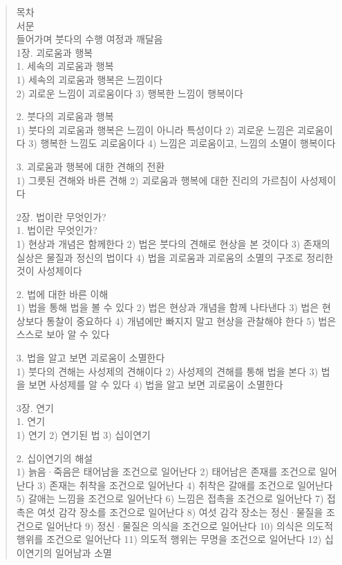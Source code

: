 \documentclass[12pt, a4paper, oneside]{book}
\begin{document}
\begin{quotation}

목차\\
서문\\
들어가며  붓다의 수행 여정과 깨달음\\

1장. 괴로움과 행복\\
1. 세속의 괴로움과 행복\\
1) 세속의 괴로움과 행복은 느낌이다\\
2) 괴로운 느낌이 괴로움이다
3) 행복한 느낌이 행복이다

2. 붓다의 괴로움과 행복\\
1) 붓다의 괴로움과 행복은 느낌이 아니라 특성이다
2) 괴로운 느낌은 괴로움이다
3) 행복한 느낌도 괴로움이다
4) 느낌은 괴로움이고, 느낌의 소멸이 행복이다

3. 괴로움과 행복에 대한 견해의 전환\\
1) 그릇된 견해와 바른 견해
2) 괴로움과 행복에 대한 진리의 가르침이 사성제이다

2장. 법이란 무엇인가?\\

1. 법이란 무엇인가?\\
1) 현상과 개념은 함께한다
2) 법은 붓다의 견해로 현상을 본 것이다
3) 존재의 실상은 물질과 정신의 법이다
4) 법을 괴로움과 괴로움의 소멸의 구조로 정리한 것이 사성제이다

2. 법에 대한 바른 이해\\
1) 법을 통해 법을 볼 수 있다
2) 법은 현상과 개념을 함께 나타낸다
3) 법은 현상보다 통찰이 중요하다
4) 개념에만 빠지지 말고 현상을 관찰해야 한다
5) 법은 스스로 보아 알 수 있다

3. 법을 알고 보면 괴로움이 소멸한다\\
1) 붓다의 견해는 사성제의 견해이다
2) 사성제의 견해를 통해 법을 본다
3) 법을 보면 사성제를 알 수 있다
4) 법을 알고 보면 괴로움이 소멸한다

3장. 연기\\

1. 연기\\
1) 연기
2) 연기된 법
3) 십이연기

2. 십이연기의 해설\\
1) 늙음·죽음은 태어남을 조건으로 일어난다
2) 태어남은 존재를 조건으로 일어난다
3) 존재는 취착을 조건으로 일어난다
4) 취착은 갈애를 조건으로 일어난다
5) 갈애는 느낌을 조건으로 일어난다
6) 느낌은 접촉을 조건으로 일어난다
7) 접촉은 여섯 감각 장소를 조건으로 일어난다
8) 여섯 감각 장소는 정신·물질을 조건으로 일어난다
9) 정신·물질은 의식을 조건으로 일어난다
10) 의식은 의도적 행위를 조건으로 일어난다
11) 의도적 행위는 무명을 조건으로 일어난다
12) 십이연기의 일어남과 소멸


\end{quotation}
\end{document}
